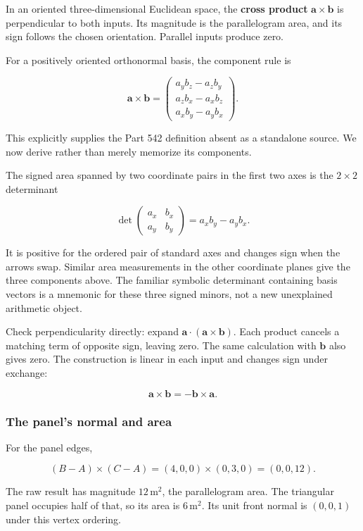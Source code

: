 In an oriented three-dimensional Euclidean space, the \textbf{cross product} \(\mathbf a\times\mathbf b\) is perpendicular to both inputs. Its magnitude is the parallelogram area, and its sign follows the chosen orientation. Parallel inputs produce zero.

For a positively oriented orthonormal basis, the component rule is

\[
\mathbf a\times\mathbf b=
\begin{pmatrix}
a_yb_z-a_zb_y\\
a_zb_x-a_xb_z\\
a_xb_y-a_yb_x
\end{pmatrix}.
\]

This explicitly supplies the Part 542 definition absent as a standalone source. We now derive rather than merely memorize its components.

The signed area spanned by two coordinate pairs in the first two axes is the \(2\times2\) determinant

\[
\det\begin{pmatrix}a_x&b_x\\a_y&b_y\end{pmatrix}
=a_xb_y-a_yb_x.
\]

It is positive for the ordered pair of standard axes and changes sign when the arrows swap. Similar area measurements in the other coordinate planes give the three components above. The familiar symbolic determinant containing basis vectors is a mnemonic for these three signed minors, not a new unexplained arithmetic object.

Check perpendicularity directly: expand \(\mathbf a\cdot(\mathbf a\times\mathbf b)\). Each product cancels a matching term of opposite sign, leaving zero. The same calculation with \(\mathbf b\) also gives zero. The construction is linear in each input and changes sign under exchange:

\[
\mathbf a\times\mathbf b=-\mathbf b\times\mathbf a.
\]

\subsubsection{The panel's normal and area}\label{the-panels-normal-and-area}

For the panel edges,

\[
(B-A)\times(C-A)=(4,0,0)\times(0,3,0)=(0,0,12).
\]

The raw result has magnitude \(12\,\mathrm{m}^2\), the parallelogram area. The triangular panel occupies half of that, so its area is \(6\,\mathrm{m}^2\). Its unit front normal is \((0,0,1)\) under this vertex ordering.

